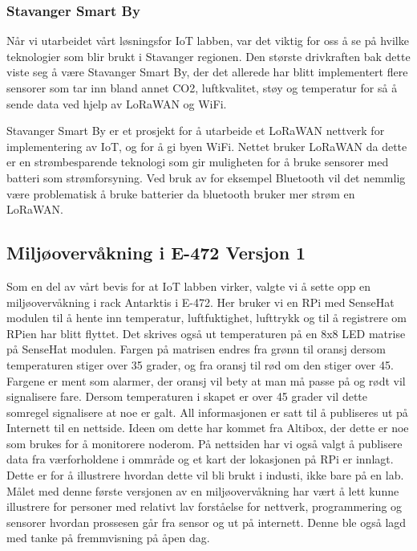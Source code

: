 \documentclass{article}
\begin{document}
\subsubsection{Stavanger Smart By}
Når vi utarbeidet vårt løsningsfor IoT labben, var det viktig for oss å se på hvilke teknologier som blir brukt i Stavanger regionen. Den største drivkraften bak dette viste seg å være Stavanger Smart By, der det allerede har blitt implementert flere sensorer som tar inn bland annet CO2, luftkvalitet, støy og temperatur for så å sende data ved hjelp av LoRaWAN og WiFi. 

Stavanger Smart By er et prosjekt for å utarbeide et LoRaWAN nettverk for implementering av IoT, og for å gi byen WiFi. Nettet bruker LoRaWAN da dette er en strømbesparende teknologi som gir muligheten for å bruke sensorer med batteri som strømforsyning. Ved bruk av for eksempel Bluetooth vil det nemmlig være problematisk å bruke batterier da bluetooth bruker mer strøm en LoRaWAN. 

\subsection{Miljøovervåkning i E-472 Versjon 1}
Som en del av vårt bevis for at IoT labben virker, valgte vi å sette opp en miljøovervåkning i rack Antarktis i E-472. Her bruker vi en RPi med SenseHat modulen til å hente inn temperatur, luftfuktighet, lufttrykk og til å registrere om RPien har blitt flyttet. Det skrives også ut temperaturen på en 8x8 LED matrise på SenseHat modulen. Fargen på matrisen endres fra grønn til oransj dersom temperaturen stiger over 35 grader, og fra oransj til rød om den stiger over 45. Fargene er ment som alarmer, der oransj vil bety at man må passe på og rødt vil signalisere fare. Dersom temperaturen i skapet er over 45 grader vil dette somregel signalisere at noe er galt. All informasjonen er satt til å publiseres ut på Internett til en nettside. Ideen om dette har kommet fra Altibox, der dette er noe som brukes for å monitorere noderom. På nettsiden har vi også valgt å publisere data fra værforholdene i ommråde og et kart der lokasjonen på RPi er innlagt. Dette er for å illustrere hvordan dette vil bli brukt i industi, ikke bare på en lab. Målet med denne første versjonen av en miljøovervåkning har vært å lett kunne illustrere for personer med relativt lav forståelse for nettverk, programmering og sensorer hvordan prossesen går fra sensor og ut på internett. Denne ble også lagd med tanke på fremmvisning på åpen dag.
\end{document}
